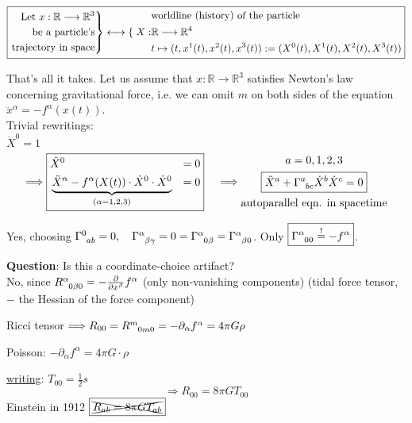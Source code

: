 $\boxed{\left. \begin{aligned}
  \text{Let } x : \mathbb{R} \to \mathbb{R}^3 \\
  \text{\quad be a particle's} \\
  \text{trajectory in space} \end{aligned} \right\rbrace \longleftrightarrow \left\lbrace \right.
\begin{aligned}
  & \text{worldline (history) of the particle} \\
  X : & \mathbb{R} \to \mathbb{R}^4 \\
  & t \mapsto (t, x^1(t), x^2(t), x^3(t)) := (X^0(t), X^1(t), X^2(t), X^3(t)) \end{aligned}}$

That's all it takes. Let us assume that $x : \mathbb{R} \to \mathbb{R}^3$ satisfies Newton's law concerning gravitational force, i.e. we can omit $m$ on both sides of the equation $\ddot{x}^\alpha = - f^\alpha(x(t))$. \\
Trivial rewritings: \\
$\dot{X}^0 =1$
\[
\Longrightarrow \boxed{\begin{aligned}
  & \ddot{X}^0 & = 0 \\
  & \underbrace{\ddot{X}^{\alpha} - f^{\alpha}(X(t))\cdot \dot{X}^0 \cdot \dot{X}^0}_{(\alpha = 1,2,3)} & = 0
\end{aligned} } \quad \, \Longrightarrow \begin{gathered}
  a = 0,1,2,3 \\
  \boxed{\ddot{X}^a + \ccf{a}{bc} \dot{X}^b \dot{X}^c = 0} \\
  \text{autoparallel eqn. in spacetime}
\end{gathered}
\]

Yes, choosing $\ccf{0}{ab} = 0, \quad \ccf{\alpha}{\beta \gamma} = 0 = \ccf{\alpha}{0 \beta} = \ccf{\alpha}{\beta 0}$. Only $\boxed{\ccf{\alpha}{00} \overset{!}{=} -f^{\alpha}}$.

\textbf{Question}: Is this a coordinate-choice artifact? \\
No, since $R\indices{^{\alpha}_{0 \beta 0}} = - \cibasis{x^{\beta}} f^{\alpha}$ (only non-vanishing components) (tidal force tensor, $-$ the Hessian of the force component)

Ricci tensor $\Longrightarrow  R_{00} = R\indices{^m_{0m0}} = -\partial_{\alpha} f^{\alpha} = 4 \pi G \rho$

Poisson: $-\partial_{\alpha} f^{\alpha} = 4 \pi G\cdot \rho$

\underline{writing}: $T_{00} = \frac{1}{2}s$
\[
\Longrightarrow \boxed{ R_{00} = 8 \pi G T_{00}}
\]
Einstein in 1912 $ \boxed{\xcancel{R_{ab} = 8\pi G T_{ab}}}$

